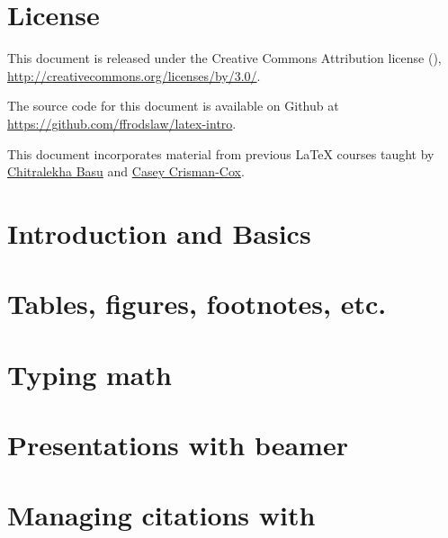 


\begin{titlepage}

\maketitle

\vspace*{4cm}
\thispagestyle{empty}

\end{titlepage}


\newpage

\section*{License}
\thispagestyle{empty}

\noindent%
This document is released under the Creative Commons Attribution license
(\ccby), {\small \url{http://creativecommons.org/licenses/by/3.0/}}.

\bigskip%
\noindent%
The source code for this document is available on Github at
{\small \url{https://github.com/ffrodslaw/latex-intro}}.

\bigskip%
\noindent%
This document incorporates material from previous \LaTeX{} courses taught by \href{http://www.chitralekha-basu.com/uploads/6/3/0/3/63033901/latex_for_absolute_beginners_-_part_one.pdf}{Chitralekha Basu} and  \href{https://drive.google.com/open?id=0BzD2LimxGIzIY083V0EzQUt6UmM}{Casey Crisman-Cox}.

\pagebreak

\tableofcontents
\thispagestyle{empty}

\pagebreak
\setcounter{page}{1}

\section{Introduction and Basics}


\newpage
\section{Tables, figures, footnotes, etc.}


\newpage
\section{Typing math}


\newpage
\section{Presentations with beamer}
	

\newpage
\section{Managing citations with }



%



